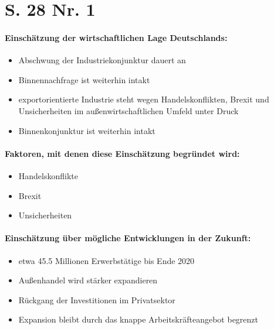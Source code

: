 \documentclass[12pt,a4paper]{report}
\begin{document}
	\section{S. 28 Nr. 1}
	\paragraph{Einschätzung der wirtschaftlichen Lage Deutschlands:}
	\begin{itemize}
		\item Abschwung der Industriekonjunktur dauert an
		\item Binnennachfrage ist weiterhin intakt
		\item exportorientierte Industrie steht wegen Handelskonflikten, Brexit und Unsicherheiten im außenwirtschaftlichen Umfeld unter Druck
		\item Binnenkonjunktur ist weiterhin intakt
	\end{itemize}
	\paragraph{Faktoren, mit denen diese Einschätzung begründet wird:}
	\begin{itemize}
		\item Handelskonflikte
		\item Brexit
		\item Unsicherheiten
	\end{itemize}
	\paragraph{Einschätzung über mögliche Entwicklungen in der Zukunft:}
	\begin{itemize}
		\item etwa 45.5 Millionen Erwerbstätige bis Ende 2020
		\item Außenhandel wird stärker expandieren
		\item Rückgang der Investitionen im Privatsektor
		\item Expansion bleibt durch das knappe Arbeitskräfteangebot begrenzt
	\end{itemize}
\end{document}

